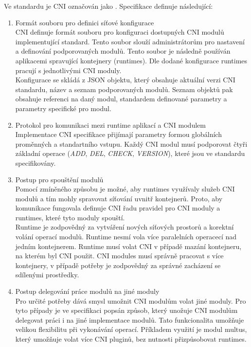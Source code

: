 Ve standardu je CNI označován jako \cite{thekubernetesauthors_2023_container}. Specifikace definuje následující:
\begin{enumerate}
    \item Formát souboru pro definici síťové konfigurace\\
    CNI definuje formát souboru pro konfiguraci dostupných CNI modulů implementující standard. Tento soubor slouží administrátorům pro nastavení a definování podporovaných modulů. Tento soubor je následně používán aplikacemi spravující kontejnery (runtimes). Dle dodané konfigurace runtimes pracují s jednotlivými CNI moduly.\\
    Konfigurace se skládá z JSON objektu, který obsahuje aktuální verzi CNI standardu, název a seznam podporovaných modulů. Seznam objektů pak obsahuje referenci na daný modul, standardem definované parametry a parametry specifické pro modul.
    \item Protokol pro komunikaci mezi runtime aplikací a CNI modulem\\
    Implementace CNI specifikace přijímají parametry formou globálních proměnných a standartního vstupu. Každý CNI modul musí podporovat čtyři základní operace (\textit{ADD}, \textit{DEL}, \textit{CHECK}, \textit{VERSION}), které jsou ve standardu specifikovány.
    \item Postup pro spouštění modulů\\
    Pomocí zmíněného způsobu je možné, aby runtimes využívaly služeb CNI modulů a tím mohly spravovat síťování uvnitř kontejnerů. Proto, aby komunikace fungovala definuje CNI řadu pravidel pro CNI moduly a runtimes, které tyto moduly spouští.\\
    Runtime je zodpovědný za vytváření nových síťových prostorů a korektní volání operací modulů. Runtime nesmí vola více paralelních operacecí nad jedním kontejnerem. Runtime musí volat CNI v případě mazání kontejneru, na kterém byl CNI použit.
    CNI modules musí správně pracovat s více kontejnery, v případě potřeby je zodpovědný za správné zacházení se sdílenými prostředky. 
    \item Postup delegování práce modulů na jiné moduly\label{enumerate:cni}\\
    Pro určité potřeby dává smysl umožnit CNI modulům volat jiné moduly. Pro tyto případy je ve specifikaci popsán způsob, který unožuje CNI modulům delegovat práci i na jiné implementace modulů. Tato funkcionalita umožňuje velikou flexibilitu při vykonávání operací. Příkladem využití je modul multus, který umožňuje volat více CNI pluginů, bez nutnosti přizpůsobovat runtimes.\\

\end{enumerate}

